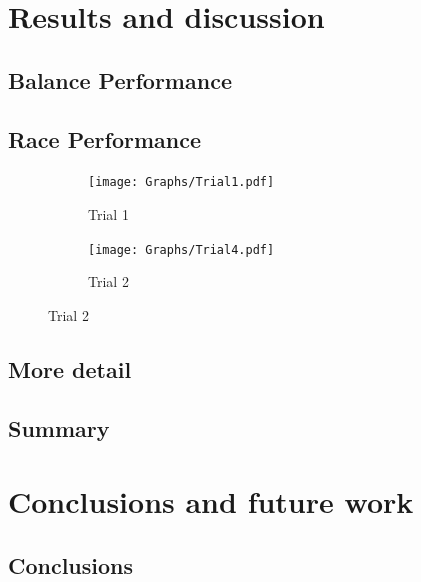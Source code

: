   \section{Results and discussion} %
    \subsection{Balance Performance}
    \subsection{Race Performance}
            
    \begin{figure} [H]
        \centering
        \begin{subfigure}[b]{0.48\textwidth}
            \texttt{[image: Graphs/Trial1.pdf]}
            \caption{Trial 1}
            \label{fig:Trial1}
        \end{subfigure}
        \hfill
        \begin{subfigure}[b]{0.48\textwidth}
            \texttt{[image: Graphs/Trial4.pdf]}
            \caption{Trial 2}
            \label{fig:Trial2}
        \end{subfigure}
    \end{figure}

    \subsection{More detail}
    \subsection{Summary}
  \section{Conclusions and future work} %
    \subsection{Conclusions}
